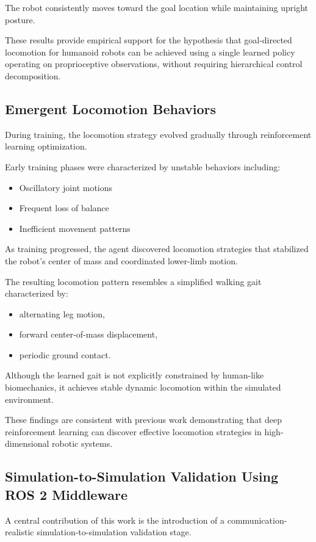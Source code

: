 \documentclass[pdflatex,sn-mathphys-num]{sn-jnl}%
\theoremstyle{thmstyleone}%
\theoremstyle{thmstyletwo}%
\theoremstyle{thmstylethree}%
\begin{document}
The robot consistently moves toward the goal location while maintaining upright posture.

These results provide empirical support for the hypothesis that goal-directed locomotion for humanoid robots can be achieved using a single learned policy operating on proprioceptive observations, without requiring hierarchical control decomposition.

\subsection{Emergent Locomotion Behaviors}
During training, the locomotion strategy evolved gradually through reinforcement learning optimization.

Early training phases were characterized by unstable behaviors including:
\begin{itemize}
    \item Oscillatory joint motions
    \item Frequent loss of balance
    \item Inefficient movement patterns
\end{itemize} 

As training progressed, the agent discovered locomotion strategies that stabilized the robot’s center of mass and coordinated lower-limb motion.

The resulting locomotion pattern resembles a simplified walking gait characterized by:
\begin{itemize}
    \item alternating leg motion,
    \item forward center-of-mass displacement,
    \item periodic ground contact.
\end{itemize} 

Although the learned gait is not explicitly constrained by human-like biomechanics, it achieves stable dynamic locomotion within the simulated environment.

These findings are consistent with previous work demonstrating that deep reinforcement learning can discover effective locomotion strategies in high-dimensional robotic systems.

\subsection{Simulation-to-Simulation Validation Using ROS 2 Middleware}
A central contribution of this work is the introduction of a communication-realistic simulation-to-simulation validation stage.
\end{document}

